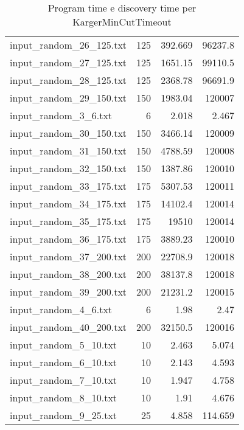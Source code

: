 \begin{table}[H]
\begin{tabular}{lrrr}
     input\_random\_26\_125.txt &     125 &          392.669 &      96237.8   \\
     input\_random\_27\_125.txt &     125 &         1651.15  &      99110.5   \\
     input\_random\_28\_125.txt &     125 &         2368.78  &      96691.9   \\
     input\_random\_29\_150.txt &     150 &         1983.04  &     120007     \\
     input\_random\_3\_6.txt    &       6 &            2.018 &          2.467 \\
     input\_random\_30\_150.txt &     150 &         3466.14  &     120009     \\
     input\_random\_31\_150.txt &     150 &         4788.59  &     120008     \\
     input\_random\_32\_150.txt &     150 &         1387.86  &     120010     \\
     input\_random\_33\_175.txt &     175 &         5307.53  &     120011     \\
     input\_random\_34\_175.txt &     175 &        14102.4   &     120014     \\
     input\_random\_35\_175.txt &     175 &        19510     &     120014     \\
     input\_random\_36\_175.txt &     175 &         3889.23  &     120010     \\
     input\_random\_37\_200.txt &     200 &        22708.9   &     120018     \\
     input\_random\_38\_200.txt &     200 &        38137.8   &     120018     \\
     input\_random\_39\_200.txt &     200 &        21231.2   &     120015     \\
     input\_random\_4\_6.txt    &       6 &            1.98  &          2.47  \\
     input\_random\_40\_200.txt &     200 &        32150.5   &     120016     \\
     input\_random\_5\_10.txt   &      10 &            2.463 &          5.074 \\
     input\_random\_6\_10.txt   &      10 &            2.143 &          4.593 \\
     input\_random\_7\_10.txt   &      10 &            1.947 &          4.758 \\
     input\_random\_8\_10.txt   &      10 &            1.91  &          4.676 \\
     input\_random\_9\_25.txt   &      25 &            4.858 &        114.659 \\
     \hline
    \end{tabular}

    \caption{Program time e discovery time per KargerMinCutTimeout}
    \label{table:kargertimeout-tunning-time}
\end{table}
